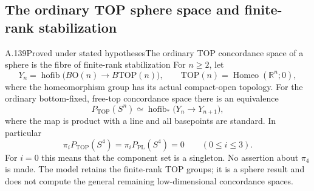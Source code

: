 \subsection{The ordinary TOP sphere space and finite-rank stabilization}

\begin{saresult}{A.139}{Proved under stated hypotheses}{The ordinary TOP concordance space of a sphere is the fibre of finite-rank stabilization}
For $n\ge2$, let
\[
 Y_n=\operatorname{hofib}\bigl(B\mathrm O(n)\longrightarrow
                                     B\mathrm{TOP}(n)\bigr),
 \qquad
 \mathrm{TOP}(n)=\operatorname{Homeo}(\mathbb R^n;0),
                                                        \tag{A.139.1}
\]
where the homeomorphism group has its actual compact-open topology.
For the ordinary bottom-fixed, free-top concordance space there is
an equivalence
\[
 P_{\mathrm{TOP}}(S^n)
   \simeq\operatorname{hofib}_*\bigl(Y_n\longrightarrow Y_{n+1}\bigr),
                                                        \tag{A.139.2}
\]
where the map is product with a line and all basepoints are standard.
In particular
\[
 \pi_i P_{\mathrm{TOP}}(S^4)=
 \pi_i P_{\mathrm{PL}}(S^4)=0\qquad(0\le i\le3).          \tag{A.139.3}
\]
For $i=0$ this means that the component set is a singleton.
No assertion about $\pi_4$ is made. The model retains the
finite-rank TOP groups; it is a sphere result and does not compute
the general remaining low-dimensional concordance spaces.
\end{saresult}
